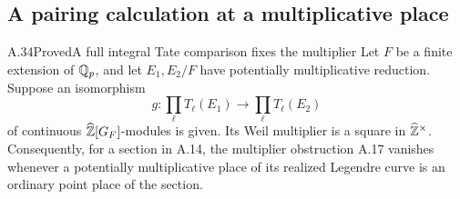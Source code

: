 \subsection{A pairing calculation at a multiplicative place}

\begin{statement}{A.34}{Proved}{A full integral Tate comparison fixes the multiplier}
Let $F$ be a finite extension of $\mathbb Q_p$, and let $E_1,E_2/F$ have
potentially multiplicative reduction.  Suppose an isomorphism
\[
                g:\prod_\ell T_\ell(E_1)
                     \longrightarrow\prod_\ell T_\ell(E_2)
\]
of continuous $\widehat{\mathbb Z}[G_F]$-modules is given.  Its Weil multiplier
is a square in $\widehat{\mathbb Z}^\times$.
Consequently, for a section in A.14, the multiplier obstruction A.17
vanishes whenever a potentially multiplicative place of its realized
Legendre curve is an ordinary point place of the section.
\end{statement}
